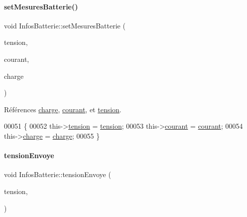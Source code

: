 \paragraph{\texorpdfstring{set\+Mesures\+Batterie()}{setMesuresBatterie()}}
{\footnotesize\ttfamily void Infos\+Batterie\+::set\+Mesures\+Batterie (\begin{DoxyParamCaption}\item[{double}]{tension,  }\item[{double}]{courant,  }\item[{double}]{charge }\end{DoxyParamCaption})}



Références \hyperlink{class_infos_batterie_af3ad72cdbbf13f2dec6d81f078a2c0d2}{charge}, \hyperlink{class_infos_batterie_a417f025b2ccddea7d28f80df4413945a}{courant}, et \hyperlink{class_infos_batterie_a45d09805075337f7f2d4b84d02a2ee47}{tension}.


\begin{DoxyCode}
00051 \{
00052     this->\hyperlink{class_infos_batterie_a45d09805075337f7f2d4b84d02a2ee47}{tension} = \hyperlink{class_infos_batterie_a45d09805075337f7f2d4b84d02a2ee47}{tension};
00053     this->\hyperlink{class_infos_batterie_a417f025b2ccddea7d28f80df4413945a}{courant} = \hyperlink{class_infos_batterie_a417f025b2ccddea7d28f80df4413945a}{courant};
00054     this->\hyperlink{class_infos_batterie_af3ad72cdbbf13f2dec6d81f078a2c0d2}{charge} = \hyperlink{class_infos_batterie_af3ad72cdbbf13f2dec6d81f078a2c0d2}{charge};
00055 \}
\end{DoxyCode}
\mbox{\label{class_infos_batterie_a932a48aafb94e5289d775bb3305fdb74}} 
\paragraph{\texorpdfstring{tension\+Envoye}{tensionEnvoye}}
{\footnotesize\ttfamily void Infos\+Batterie\+::tension\+Envoye (\begin{DoxyParamCaption}\item[{const double}]{tension,  }\item[{Q\+String}]{ }\end{DoxyParamCaption})\hspace{0.3cm}{\ttfamily [signal]}}



